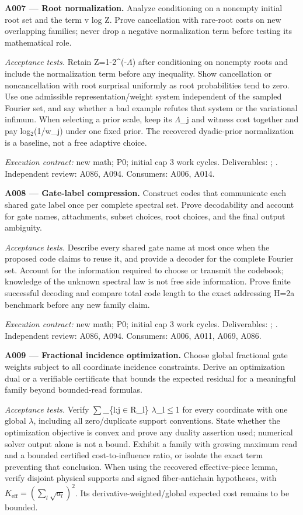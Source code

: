 \documentclass[11pt]{article}
\begin{document}
\textbf{A007 --- Root normalization.} Analyze conditioning on a nonempty initial root set and the term v log Z. Prove cancellation with rare-root costs on new overlapping families; never drop a negative normalization term before testing its mathematical role.

\emph{Acceptance tests.} Retain Z=1-2\textasciicircum{}(-$\Lambda$) after conditioning on nonempty roots and include the normalization term before any inequality. Show cancellation or noncancellation with root surprisal uniformly as root probabilities tend to zero. Use one admissible representation/weight system independent of the sampled Fourier set, and say whether a bad example refutes that system or the variational infimum. When selecting a prior scale, keep its $\Lambda$\_j and witness cost together and pay log$_2$(1/w\_j) under one fixed prior. The recovered dyadic-prior normalization is a baseline, not a free adaptive choice.

{\small\emph{Execution contract:} new math; P0; initial cap 3 work cycles. Deliverables: ; . Independent review: A086, A094. Consumers: A006, A014.}

\textbf{A008 --- Gate-label compression.} Construct codes that communicate each shared gate label once per complete spectral set. Prove decodability and account for gate names, attachments, subset choices, root choices, and the final output ambiguity.

\emph{Acceptance tests.} Describe every shared gate name at most once when the proposed code claims to reuse it, and provide a decoder for the complete Fourier set. Account for the information required to choose or transmit the codebook; knowledge of the unknown spectral law is not free side information. Prove finite successful decoding and compare total code length to the exact addressing H=2a benchmark before any new family claim.

{\small\emph{Execution contract:} new math; P0; initial cap 3 work cycles. Deliverables: ; . Independent review: A086, A094. Consumers: A006, A011, A069, A086.}

\textbf{A009 --- Fractional incidence optimization.} Choose global fractional gate weights subject to all coordinate incidence constraints. Derive an optimization dual or a verifiable certificate that bounds the expected residual for a meaningful family beyond bounded-read formulas.

\emph{Acceptance tests.} Verify $\sum$\_\{l:j$\in$R\_l\} $\lambda$\_l$\le$1 for every coordinate with one global $\lambda$, including all zero/duplicate support conventions. State whether the optimization objective is convex and prove any duality assertion used; numerical solver output alone is not a bound. Exhibit a family with growing maximum read and a bounded certified cost-to-influence ratio, or isolate the exact term preventing that conclusion. When using the recovered effective-piece lemma, verify disjoint physical supports and signed fiber-antichain hypotheses, with $K_{\mathrm{eff}}=(\sum_l\sqrt{a_l})^2$. Its derivative-weighted/global expected cost remains to be bounded.
\end{document}
